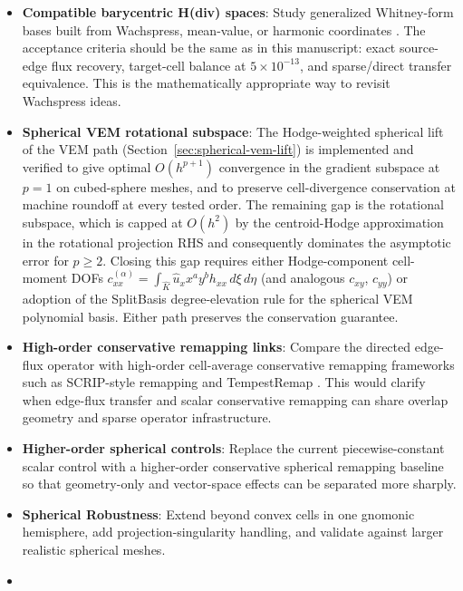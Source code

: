 \documentclass[11pt]{article}
\begin{document}
\begin{itemize}
    \item \textbf{Compatible barycentric H(div) spaces}: Study generalized
    Whitney-form bases built from Wachspress, mean-value, or harmonic
    coordinates \cite{GilletteRandBajaj2016}.  The acceptance criteria should
    be the same as in this manuscript: exact source-edge flux recovery,
    target-cell balance at \(5\times10^{-13}\), and sparse/direct transfer
    equivalence.  This is the mathematically appropriate way to revisit
    Wachspress ideas.
    \item \textbf{Spherical VEM rotational subspace}: The Hodge-weighted
    spherical lift of the VEM path (Section~\ref{sec:spherical-vem-lift})
    is implemented and verified to give optimal \(O(h^{p+1})\) convergence
    in the gradient subspace at \(p=1\) on cubed-sphere meshes, and to
    preserve cell-divergence conservation at machine roundoff at every
    tested order.  The remaining gap is the rotational subspace, which is
    capped at \(O(h^2)\) by the centroid-Hodge approximation in the
    rotational projection RHS and consequently dominates the asymptotic
    error for \(p\ge2\).  Closing this gap requires either Hodge-component
    cell-moment DOFs \(c_{xx}^{(\alpha)}=\int_{\hat K}\hat u_x x^a y^b
    h_{xx}\,d\xi\,d\eta\) (and analogous \(c_{xy}\), \(c_{yy}\)) or
    adoption of the SplitBasis degree-elevation rule for the spherical VEM
    polynomial basis.  Either path preserves the conservation guarantee.
    \item \textbf{High-order conservative remapping links}: Compare the
    directed edge-flux operator with high-order cell-average conservative
    remapping frameworks such as SCRIP-style remapping and TempestRemap
    \cite{Jones1999,UllrichTaylor2015,UllrichDevendranJohansen2016}.  This
    would clarify when edge-flux transfer and scalar conservative remapping can
    share overlap geometry and sparse operator infrastructure.
    \item \textbf{Higher-order spherical controls}: Replace the current
    piecewise-constant scalar control with a higher-order conservative
    spherical remapping baseline so that geometry-only and vector-space
    effects can be separated more sharply.
    \item \textbf{Spherical Robustness}: Extend beyond convex cells in one
    gnomonic hemisphere, add projection-singularity handling, and validate
    against larger realistic spherical meshes.
    \item {}\label{sec:future-clipping}

\end{itemize}
\end{document}
